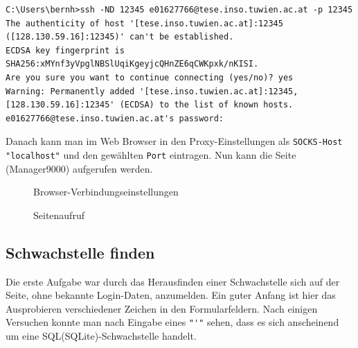 \documentclass[12pt,a4paper,titlepage,oneside]{scrartcl}
\begin{document}
\begin{lstlisting}
C:\Users\bernh>ssh -ND 12345 e01627766@tese.inso.tuwien.ac.at -p 12345
The authenticity of host '[tese.inso.tuwien.ac.at]:12345 ([128.130.59.16]:12345)' can't be established.
ECDSA key fingerprint is SHA256:xMYnf3yVpglNBSlUqiKgeyjcQHnZE6qCWKpxk/nKISI.
Are you sure you want to continue connecting (yes/no)? yes
Warning: Permanently added '[tese.inso.tuwien.ac.at]:12345,[128.130.59.16]:12345' (ECDSA) to the list of known hosts.
e01627766@tese.inso.tuwien.ac.at's password:
\end{lstlisting}

Danach kann man im Web Browser in den Proxy-Einstellungen als \lstinline{SOCKS-Host "localhost"} und den gewählten \lstinline{Port} eintragen. Nun kann die Seite (Manager9000) aufgerufen werden.

\begin{figure}[h!]
  \centering
  \caption{Browser-Verbindungseinstellungen}
  \label{fig:proxy}
\end{figure}

\begin{figure}[h!]
  \centering
  \caption{Seitenaufruf}
  \label{fig:enterSite}
\end{figure}

\pagebreak

\subsection{Schwachstelle finden}

Die erste Aufgabe war durch das Herausfinden einer Schwachstelle sich auf der Seite, ohne bekannte Login-Daten, anzumelden.
Ein guter Anfang ist hier das Ausprobieren verschiedener Zeichen in den Formularfeldern. Nach einigen Versuchen konnte man nach Eingabe eines \lstinline{"'"} sehen, dass es sich anscheinend um eine SQL(SQLite)-Schwachstelle handelt.
\end{document}

